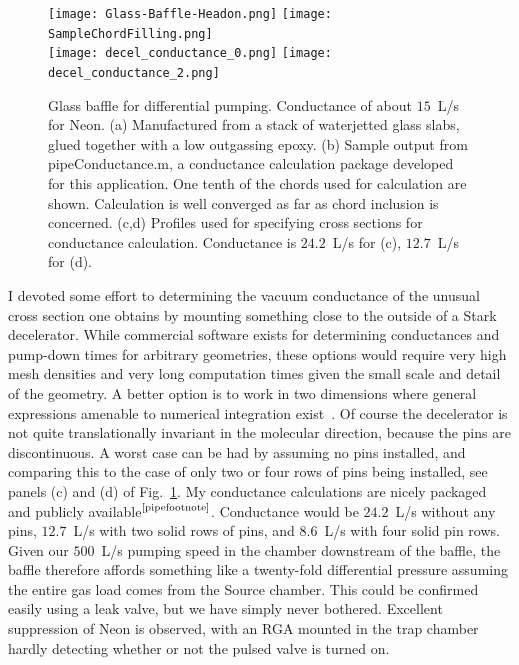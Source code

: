 \begin{figure}[t!]
\centering
\texttt{[image: Glass-Baffle-Headon.png]}
\texttt{[image: SampleChordFilling.png]}\\
\texttt{[image: decel\_conductance\_0.png]}
\texttt{[image: decel\_conductance\_2.png]}
\caption[Glass Baffle for Differential Pumping]{\label{glassbaffleimage}
Glass baffle for differential pumping. Conductance of about $15$~L/s for Neon. (a) Manufactured from a stack of waterjetted glass slabs, glued together with a low outgassing epoxy. (b) Sample output from pipeConductance.m, a conductance calculation package developed for this application\footnotemark. One tenth of the chords used for calculation are shown. Calculation is well converged as far as chord inclusion is concerned. (c,d) Profiles used for specifying cross sections for conductance calculation. Conductance is $24.2$~L/s for (c), $12.7$~L/s for (d).}
\end{figure}

I devoted some effort to determining the vacuum conductance of the unusual cross section one obtains by mounting something close to the outside of a Stark decelerator.
While commercial software exists for determining conductances and pump-down times for arbitrary geometries, these options would require very high mesh densities and very long computation times given the small scale and detail of the geometry.
A better option is to work in two dimensions where general expressions amenable to numerical integration exist~\citep[Eq.~14]{Steckelmacher1966}.
Of course the decelerator is not quite translationally invariant in the molecular direction, because the pins are discontinuous.
A worst case can be had by assuming no pins installed, and comparing this to the case of only two or four rows of pins being installed, see panels (c) and (d) of Fig.~\ref{glassbaffleimage}.
My conductance calculations are nicely packaged and publicly available$^{\text{\ref{pipefootnote}}}$.
Conductance would be $24.2$~L/s without any pins, $12.7$~L/s with two solid rows of pins, and $8.6$~L/s with four solid pin rows.
Given our $500$~L/s pumping speed in the chamber downstream of the baffle, the baffle therefore affords something like a twenty-fold differential pressure assuming the entire gas load comes from the Source chamber.
This could be confirmed easily using a leak valve, but we have simply never bothered.
Excellent suppression of Neon is observed, with an RGA mounted in the trap chamber hardly detecting whether or not the pulsed valve is turned on.



%